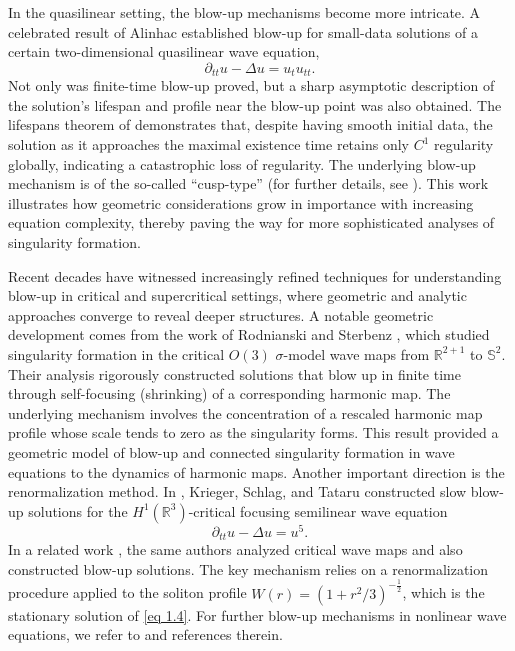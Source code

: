 \documentclass[11pt,reqno,oneside]{amsart}
\numberwithin{equation}{section}
\theoremstyle{definition}
\theoremstyle{remark}
\numberwithin{equation}{section}
\begin{document}
	In the quasilinear setting, the blow-up mechanisms become more intricate. A celebrated result of Alinhac \cite{alinhac1999} established blow-up for small-data solutions of a certain two-dimensional quasilinear wave equation,
	$$
	\partial_{tt}u-\Delta u=u_t u_{tt}.
	$$
	Not only was finite-time blow-up proved, but a sharp asymptotic description of the solution's lifespan and profile near the blow-up point was also obtained. The lifespans theorem of \cite{alinhac1999} demonstrates that, despite having smooth initial data, the solution as it approaches the maximal existence time retains only $C^1$ regularity globally, indicating a catastrophic loss of regularity. The underlying blow-up mechanism is of the so-called “cusp-type” (for further details, see \cite{alinhac1995blowup}). This work illustrates how geometric considerations grow in importance with increasing equation complexity, thereby paving the way for more sophisticated analyses of singularity formation.
	
	Recent decades have witnessed increasingly refined techniques for understanding blow-up in critical and supercritical settings, where geometric and analytic approaches converge to reveal deeper structures. A notable geometric development comes from the work of Rodnianski and Sterbenz \cite{rodnianski2010formation}, which studied singularity formation in the critical $O(3)$ $\sigma$-model wave maps from $\mathbb{R}^{2+1}$ to $\mathbb{S}^2$. Their analysis rigorously constructed solutions that blow up in finite time through self-focusing (shrinking) of a corresponding harmonic map. The underlying mechanism involves the concentration of a rescaled harmonic map profile whose scale tends to zero as the singularity forms. This result provided a geometric model of blow-up and connected singularity formation in wave equations to the dynamics of harmonic maps. Another important direction is the renormalization method. In \cite{krieger2009slow}, Krieger, Schlag, and Tataru constructed slow blow-up solutions for the $H^1(\mathbb{R}^3)$-critical focusing semilinear wave equation  
	\begin{equation}\label{eq 1.4}
		\partial_{tt}u-\Delta u=u^5.
	\end{equation}  
	In a related work \cite{Krieger}, the same authors analyzed critical wave maps and also constructed blow-up solutions. The key mechanism relies on a renormalization procedure applied to the soliton profile $W(r)=\left(1+r^2/3\right)^{-\frac{1}{2}}$, which is the stationary solution of \eqref{eq 1.4}. For further blow-up mechanisms in nonlinear wave equations, we refer to \cite{collot2018typeII,duyckaerts2013classification,duyckaerts2011universality,kato1980,hormander1997lectures,kenig2008global,MerleZaag,Sogge,Strauss,DonningerRao2020Blowup,DonningerSchorkhuber2016} and references therein.
	
\end{document}

